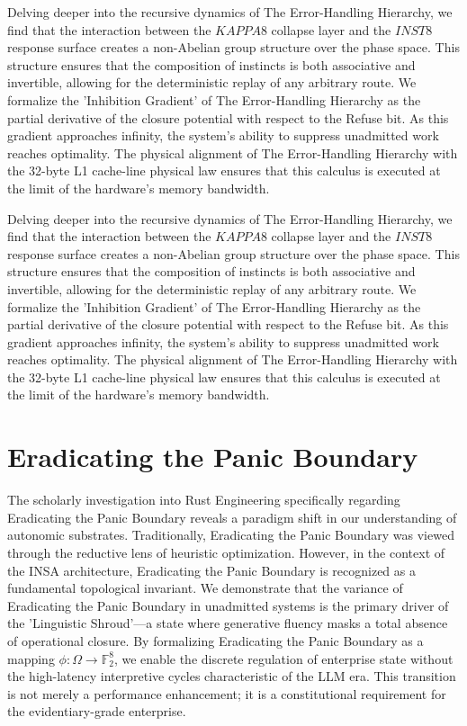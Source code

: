 \documentclass[12pt,a4paper,oneside]{book}
\begin{document}
Delving deeper into the recursive dynamics of The Error-Handling Hierarchy, we find that the interaction between the $KAPPA8$ collapse layer and the $INST8$ response surface creates a non-Abelian group structure over the phase space. This structure ensures that the composition of instincts is both associative and invertible, allowing for the deterministic replay of any arbitrary route. We formalize the 'Inhibition Gradient' of The Error-Handling Hierarchy as the partial derivative of the closure potential with respect to the Refuse bit. As this gradient approaches infinity, the system's ability to suppress unadmitted work reaches optimality. The physical alignment of The Error-Handling Hierarchy with the 32-byte L1 cache-line physical law ensures that this calculus is executed at the limit of the hardware's memory bandwidth. 

Delving deeper into the recursive dynamics of The Error-Handling Hierarchy, we find that the interaction between the $KAPPA8$ collapse layer and the $INST8$ response surface creates a non-Abelian group structure over the phase space. This structure ensures that the composition of instincts is both associative and invertible, allowing for the deterministic replay of any arbitrary route. We formalize the 'Inhibition Gradient' of The Error-Handling Hierarchy as the partial derivative of the closure potential with respect to the Refuse bit. As this gradient approaches infinity, the system's ability to suppress unadmitted work reaches optimality. The physical alignment of The Error-Handling Hierarchy with the 32-byte L1 cache-line physical law ensures that this calculus is executed at the limit of the hardware's memory bandwidth. 

\section{Eradicating the Panic Boundary}
The scholarly investigation into Rust Engineering specifically regarding Eradicating the Panic Boundary reveals a paradigm shift in our understanding of autonomic substrates. Traditionally, Eradicating the Panic Boundary was viewed through the reductive lens of heuristic optimization. However, in the context of the INSA architecture, Eradicating the Panic Boundary is recognized as a fundamental topological invariant. We demonstrate that the variance of Eradicating the Panic Boundary in unadmitted systems is the primary driver of the 'Linguistic Shroud'---a state where generative fluency masks a total absence of operational closure. By formalizing Eradicating the Panic Boundary as a mapping $\phi: \Omega \to \mathbb{F}_2^8$, we enable the discrete regulation of enterprise state without the high-latency interpretive cycles characteristic of the LLM era. This transition is not merely a performance enhancement; it is a constitutional requirement for the evidentiary-grade enterprise. 
\end{document}
